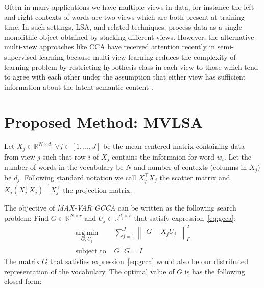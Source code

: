 \documentclass[11pt]{article}
\begin{document}
Often in many applications we have multiple views in data, for
instance the left and right contexts of words are two views which are both
present at training time. In such
settings, LSA, and related techniques, process data as a single
monolithic object obtained by stacking different views. However, the
alternative multi-view approaches like CCA have received attention
recently in semi-supervised learning because multi-view learning reduces the complexity of learning problem by
restricting hypothesis class in each view to those which tend to
agree with each other under the assumption that either
view has sufficient information about the latent semantic content
 \cite{sridharan2008information}. 

\section{Proposed Method: MVLSA}
\label{sec:gcca}
Let $X_j \in \mathbb{R}^{N\times d_j} \;
\forall j \in [1,\ldots,J]$ be the mean centered matrix containing
data from view $j$ such that row $i$ of $X_j$ contains the informaion for
word $w_i$. Let the number of words in the vocabulary be $N$
and number of contexts (columns in $X_j$) be $d_j$. %
Following standard
notation \cite{hastie2009elements} we call $X_j^\top X_j$ the scatter
matrix and $X_j (X_j^\top X_j)^{-1}X_j^\top$ the projection matrix.

The objective of \emph{MAX-VAR GCCA} can be written as the following search problem:
 Find $G \in \mathbb{R}^{N\times r}$ and $U_j \in
\mathbb{R}^{d_j \times r}$ that satisfy expression~\ref{eq:gcca}:
\begin{equation}
  \label{eq:gcca}
\begin{split}
  \operatorname*{\arg\,\min}_{G,U_j} & \sum_{j=1}^J \begin{Vmatrix} G - X_jU_j \end{Vmatrix}^2_F \\
  \text{subject to } & G^\top G = I
\end{split}
\end{equation}
The matrix $G$ that satisfies expression~\ref{eq:gcca} would also be our
distributed representation of the vocabulary.
The optimal value of $G$ is has the following closed form:
\end{document}
